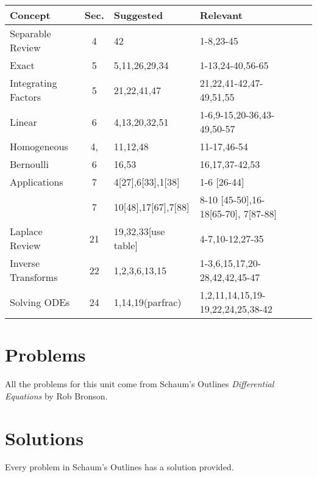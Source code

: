 	

\begin{center}

\begin{tabular}{|l|c|l|l|l|l|}
\hline
Concept	&Sec.	&Suggested	&Relevant	\\\hline
Separable Review&4 & 42 &1-8,23-45	\\\hline
Exact &5 & 5,11,26,29,34& 1-13,24-40,56-65	\\\hline
Integrating Factors&5 & 21,22,41,47 & 21,22,41-42,47-49,51,55	\\\hline
Linear&6 &4,13,20,32,51 & 1-6,9-15,20-36,43-49,50-57	\\\hline
Homogeneous&4, &11,12,48 &11-17,46-54	\\\hline
Bernoulli &6 & 16,53& 16,17,37-42,53	\\\hline
Applications&7 &4[27],6[33],1[38] & 1-6 [26-44]	\\
&7 &10[48],17[67],7[88] & 8-10 [45-50],16-18[65-70], 7[87-88]	\\\hline
Laplace Review &21 & 19,32,33[use table] & 4-7,10-12,27-35	\\\hline
Inverse Transforms &22 & 1,2,3,6,13,15 & 1-3,6,15,17,20-28,42,42,45-47	\\\hline
Solving ODEs &24 & 1,14,19(parfrac) & 1,2,11,14,15,19-19,22,24,25,38-42 	\\\hline
\end{tabular}
\end{center}

\section{Problems}
All the problems for this unit come from Schaum's Outlines \textit{Differential Equations} by Rob Bronson.
\section{Solutions}
Every problem in Schaum's Outlines has a solution provided.  